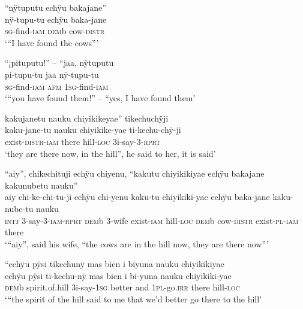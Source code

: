 \ea%
\begingl 
\glpreamble “nÿtuputu echÿu bakajane”\\
\gla nÿ-tupu-tu echÿu baka-jane\\ 
\textsc{sg}-find-\textsc{iam} \textsc{dem}b cow-\textsc{distr}\\ 
\glft ‘“I have found the cows”’\\ 
\endgl
\xe

\ea%
\begingl 
\glpreamble “¡pituputu!” – “jaa, nÿtuputu\\
\gla pi-tupu-tu jaa nÿ-tupu-tu\\ 
\textsc{sg}-find-\textsc{iam} \textsc{afm} 1\textsc{sg}-find-\textsc{iam}\\ 
\glft ‘“you have found them!” – “yes, I have found them’\\ 
\endgl
\xe

\ea%
\begingl 
\glpreamble kakujanetu nauku chiyikikeyae” tikechuchÿji\\
\gla kaku-jane-tu nauku chiyikike-yae ti-kechu-chÿ-ji\\ 
\glb exist-\textsc{distr}-\textsc{iam} there hill-\textsc{loc} 3i-say-3-\textsc{rprt}\\ 
\glft ‘they are there now, in the hill”, he said to her, it is said’\\ 
\endgl
\xe

\ea%
\begingl 
\glpreamble “aiy”, chikechituji echÿu chiyenu, “kakutu chiyikikiyae echÿu bakajane kakunubetu nauku”\\
\gla aiy chi-ke-chi-tu-ji echÿu chi-yenu kaku-tu chiyikiki-yae echÿu baka-jane kaku-nube-tu nauku\\ 
\glb \textsc{intj} 3-say-3-\textsc{iam}-\textsc{rprt} \textsc{dem}b 3-wife exist-\textsc{iam} hill-\textsc{loc} \textsc{dem}b cow-\textsc{distr} exist-\textsc{pl}-\textsc{iam} there\\ 
\glft ‘“aiy”, said his wife, “the cows are in the hill now, they are there now”’\\ 
\endgl
\xe


\ea%
\begingl 
\glpreamble “echÿu pÿsi tikechunÿ mas bien i biyuna nauku chiyikikiyae\\
\gla echÿu pÿsi ti-kechu-nÿ {mas bien} i bi-yuna nauku chiyikiki-yae\\ 
\glb \textsc{dem}b spirit.of.hill 3i-say-1\textsc{sg} better and 1\textsc{pl}-go.\textsc{irr} there hill-\textsc{loc}\\ 
\glft ‘“the spirit of the hill said to me that we’d better go there to the hill’\\ 
\endgl
\xe

